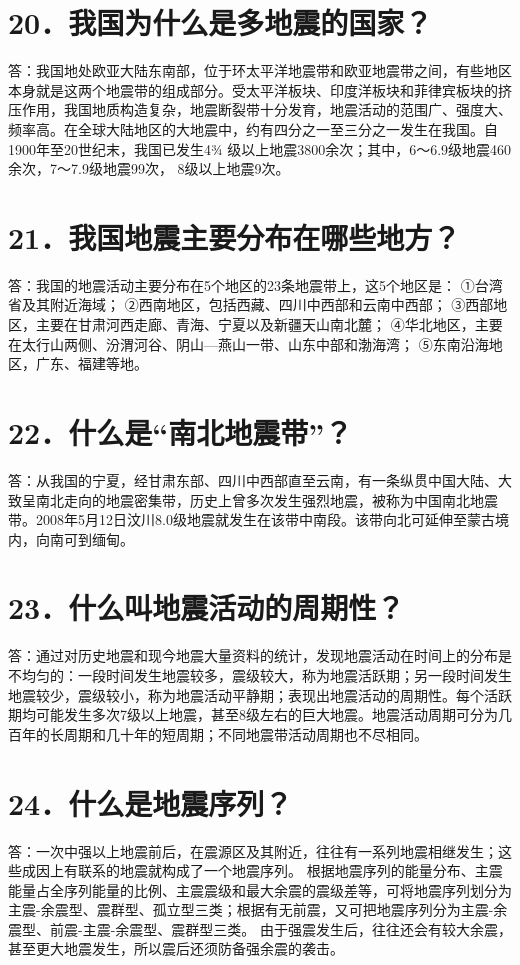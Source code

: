 \documentclass[a4paper,10pt,english]{sphinxmanual}
\begin{document}
\section{20．我国为什么是多地震的国家？}
\label{\detokenize{index:id22}}
答：我国地处欧亚大陆东南部，位于环太平洋地震带和欧亚地震带之间，有些地区本身就是这两个地震带的组成部分。受太平洋板块、印度洋板块和菲律宾板块的挤压作用，我国地质构造复杂，地震断裂带十分发育，地震活动的范围广、强度大、频率高。在全球大陆地区的大地震中，约有四分之一至三分之一发生在我国。自1900年至20世纪末，我国已发生4¾ 级以上地震3800余次；其中，6～6.9级地震460余次，7～7.9级地震99次， 8级以上地震9次。


\section{21．我国地震主要分布在哪些地方？}
\label{\detokenize{index:id23}}
答：我国的地震活动主要分布在5个地区的23条地震带上，这5个地区是：
①台湾省及其附近海域；
②西南地区，包括西藏、四川中西部和云南中西部；
③西部地区，主要在甘肃河西走廊、青海、宁夏以及新疆天山南北麓；
④华北地区，主要在太行山两侧、汾渭河谷、阴山—燕山一带、山东中部和渤海湾；
⑤东南沿海地区，广东、福建等地。


\section{22．什么是“南北地震带”？}
\label{\detokenize{index:id24}}
答：从我国的宁夏，经甘肃东部、四川中西部直至云南，有一条纵贯中国大陆、大致呈南北走向的地震密集带，历史上曾多次发生强烈地震，被称为中国南北地震带。2008年5月12日汶川8.0级地震就发生在该带中南段。该带向北可延伸至蒙古境内，向南可到缅甸。


\section{23．什么叫地震活动的周期性？}
\label{\detokenize{index:id25}}
答：通过对历史地震和现今地震大量资料的统计，发现地震活动在时间上的分布是不均匀的：一段时间发生地震较多，震级较大，称为地震活跃期；另一段时间发生地震较少，震级较小，称为地震活动平静期；表现出地震活动的周期性。每个活跃期均可能发生多次7级以上地震，甚至8级左右的巨大地震。地震活动周期可分为几百年的长周期和几十年的短周期；不同地震带活动周期也不尽相同。


\section{24．什么是地震序列？}
\label{\detokenize{index:id26}}
答：一次中强以上地震前后，在震源区及其附近，往往有一系列地震相继发生；这些成因上有联系的地震就构成了一个地震序列。
根据地震序列的能量分布、主震能量占全序列能量的比例、主震震级和最大余震的震级差等，可将地震序列划分为主震-余震型、震群型、孤立型三类；根据有无前震，又可把地震序列分为主震-余震型、前震-主震-余震型、震群型三类。
由于强震发生后，往往还会有较大余震，甚至更大地震发生，所以震后还须防备强余震的袭击。
\end{document}
